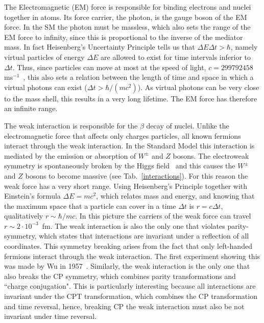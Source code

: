 The Electromagnetic (EM) force is responsible for binding electrons and nuclei together in atoms.
Its force carrier, the photon, is the gauge boson of the EM force. In the SM the photon must be massless,
which also sets the range of the EM force to infinity, since this is proportional to the inverse of the mediator mass.
In fact Heisenberg's Uncertainty Principle tells us that $\Delta E \Delta t > \hbar$, namely virtual particles
of energy $\Delta E$ are allowed to exist for time intervals inferior to $\Delta t$. Thus, since particles can move
at most at the speed of light, $c = 299792458$ ms$^{-1}$~\cite{PDG2014}, this also sets a relation between the length 
of time and space in which a virtual photons can exist ($\Delta t > \hbar / (mc^2)$). As virtual photons can be very
close to the mass shell, this results in a very long lifetime. The EM force has therefore an infinite range.

The weak interaction is responsible for the $\beta$ decay of nuclei. Unlike the electromagnetic force that affects only
charges particles, all known fermions interact through the weak interaction. In the Standard Model this interaction is mediated
by the emission or absorption of $W^\pm$ and $Z$ bosons. The electroweak symmetry is spontaneously broken by the Higgs
field~\cite{Strocchi:1977za} and this causes the $W^\pm$ and $Z$ bosons to become massive (see Tab.~\ref{interactions}).
For this reason the weak force has a very short range. Using Heisenberg's Principle together with Einstein's formula 
$\Delta E = m c^2$, which relates mass and energy, and knowing that the maximum space that a particle can cover in a time 
$\Delta t$ is $r = c \Delta t$, qualitatively $r \sim \hbar / mc$. In this picture the carriers of the weak force can travel
$r \sim 2 \cdot 10^{-3}$~fm.
The weak interaction is also the only one that violates parity-symmetry, which states that interactions are invariant under
a reflection of all coordinates. This symmetry breaking arises from the fact that only left-handed fermions interact through
the weak interaction. The first experiment showing this was made by Wu in 1957~\cite{Wu:1957my}. Similarly, the weak interaction
is the only one that also breaks the CP symmetry, which combines parity transformations and ``charge conjugation".
This is particularly interesting because all interactions are invariant under the CPT transformation, which combines the CP
transformation and time reversal, hence, breaking CP the weak interaction must also be not invariant under time reversal.


